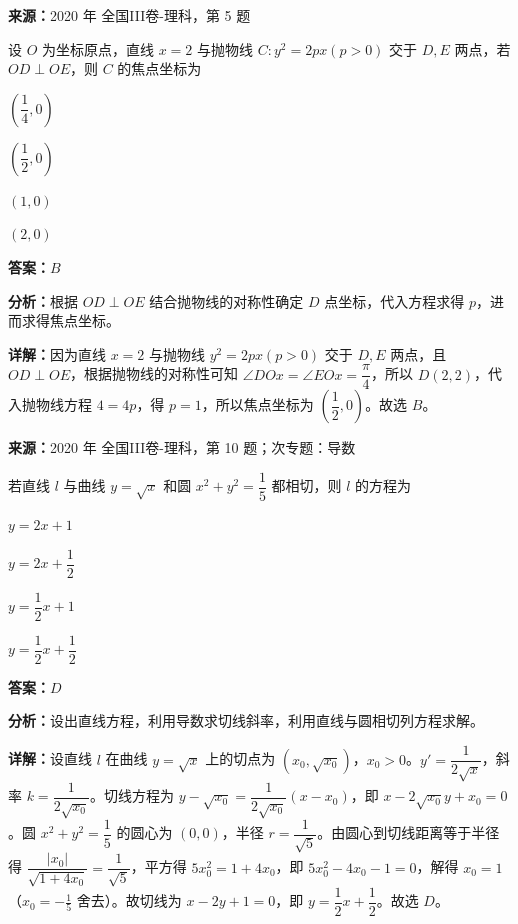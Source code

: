 \begin{question}[points=5]
\textbf{来源：}2020 年 全国III卷-理科，第 5 题\par
设 $O$ 为坐标原点，直线 $x=2$ 与抛物线 $C:y^2=2px(p>0)$ 交于 $D,E$ 两点，若 $OD\perp OE$，则 $C$ 的焦点坐标为
\begin{choices}
  \item $(\dfrac14,0)$
  \item $(\dfrac12,0)$
  \item $(1,0)$
  \item $(2,0)$
\end{choices}
\begin{solution}
\textbf{答案：}$B$

\textbf{分析：}根据 $OD\perp OE$ 结合抛物线的对称性确定 $D$ 点坐标，代入方程求得 $p$，进而求得焦点坐标。

\textbf{详解：}因为直线 $x=2$ 与抛物线 $y^2=2px(p>0)$ 交于 $D,E$ 两点，且 $OD\perp OE$，根据抛物线的对称性可知 $\angle DOx=\angle EO x=\dfrac{\pi}{4}$，所以 $D(2,2)$，代入抛物线方程 $4=4p$，得 $p=1$，所以焦点坐标为 $(\dfrac12,0)$。故选 $B$。
\end{solution}
\end{question}

\begin{question}[points=5]
\textbf{来源：}2020 年 全国III卷-理科，第 10 题；次专题：导数\par
若直线 $l$ 与曲线 $y=\sqrt{x}$ 和圆 $x^2+y^2=\dfrac{1}{5}$ 都相切，则 $l$ 的方程为
\begin{choices}
  \item $y=2x+1$
  \item $y=2x+\dfrac12$
  \item $y=\dfrac12x+1$
  \item $y=\dfrac12x+\dfrac12$
\end{choices}
\begin{solution}
\textbf{答案：}$D$

\textbf{分析：}设出直线方程，利用导数求切线斜率，利用直线与圆相切列方程求解。

\textbf{详解：}设直线 $l$ 在曲线 $y=\sqrt{x}$ 上的切点为 $(x_0,\sqrt{x_0})$，$x_0>0$。$y'=\dfrac{1}{2\sqrt{x}}$，斜率 $k=\dfrac{1}{2\sqrt{x_0}}$。切线方程为 $y-\sqrt{x_0}=\dfrac{1}{2\sqrt{x_0}}(x-x_0)$，即 $x-2\sqrt{x_0}y+x_0=0$。圆 $x^2+y^2=\dfrac15$ 的圆心为 $(0,0)$，半径 $r=\dfrac{1}{\sqrt{5}}$。由圆心到切线距离等于半径得 $\dfrac{|x_0|}{\sqrt{1+4x_0}}=\dfrac{1}{\sqrt{5}}$，平方得 $5x_0^2=1+4x_0$，即 $5x_0^2-4x_0-1=0$，解得 $x_0=1$（$x_0=-\frac15$ 舍去）。故切线为 $x-2y+1=0$，即 $y=\dfrac12x+\dfrac12$。故选 $D$。
\end{solution}
\end{question}

